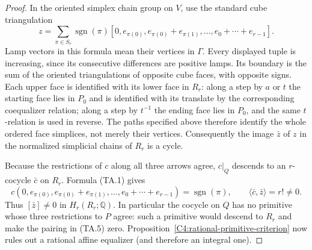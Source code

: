 \begin{proof}
In the oriented simplex chain group on $V$, use the standard cube
triangulation
\[
 z=\sum_{\pi\in S_r}\operatorname{sgn}(\pi)
 \left[0,e_{\pi(0)},e_{\pi(0)}+e_{\pi(1)},\ldots,
                         e_0+\cdots+e_{r-1}\right].
 \tag{TA.4}
\]
Lamp vectors in this formula mean their vertices in $\Gamma$.
Every displayed tuple is increasing, since its consecutive
differences are positive lamps. Its boundary is the sum of the
oriented triangulations of opposite cube faces, with opposite
signs. Each upper face is identified with its lower face in
$R_r$: along a step by $a$ or $t$ the starting face lies in $P_0$
and is identified with its translate by the corresponding
coequalizer relation; along a step by $t^{-1}$ the ending face
lies in $P_0$, and the same $t$-relation is used in reverse.
The paths specified above therefore identify the whole ordered
face simplices, not merely their vertices. Consequently the image
$\bar z$ of $z$ in the normalized simplicial chains of $R_r$ is a
cycle.

Because the restrictions of $c$ along all three arrows agree,
$c|_Q$ descends to an $r$-cocycle $\bar c$ on $R_r$. Formula
(TA.1) gives
\[
 c\left(0,e_{\pi(0)},e_{\pi(0)}+e_{\pi(1)},\ldots,
                  e_0+\cdots+e_{r-1}\right)
       =\operatorname{sgn}(\pi),
 \qquad \langle\bar c,\bar z\rangle=r!\ne0.
 \tag{TA.5}
\]
Thus $[\bar z]\ne0$ in $H_r(R_r;\mathbb Q)$. In particular the
cocycle on $Q$ has no primitive whose three restrictions to $P$
agree: such a primitive would descend to $R_r$ and make the
pairing in (TA.5) zero. Proposition~\ref{C4:rational-primitive-criterion}
now rules out a rational affine equalizer (and therefore an
integral one).
\end{proof}

